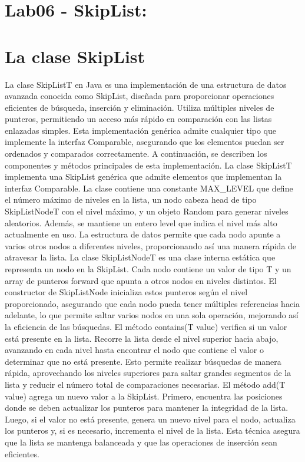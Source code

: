 \section{Lab06 - SkipList:}

\section{La clase SkipList}

La clase SkipList\<T\> en Java es una implementación de una estructura de datos avanzada conocida como SkipList, diseñada para proporcionar operaciones eficientes de búsqueda, inserción y eliminación. Utiliza múltiples niveles de punteros, permitiendo un acceso más rápido en comparación con las listas enlazadas simples. Esta implementación genérica admite cualquier tipo que implemente la interfaz Comparable, asegurando que los elementos puedan ser ordenados y comparados correctamente. A continuación, se describen los componentes y métodos principales de esta implementación.
\singlespacing
La clase SkipList\<T\> implementa una SkipList genérica que admite elementos que implementan la interfaz Comparable. La clase contiene una constante MAX\_LEVEL que define el número máximo de niveles en la lista, un nodo cabeza head de tipo SkipListNode\<T\> con el nivel máximo, y un objeto Random para generar niveles aleatorios. Además, se mantiene un entero level que indica el nivel más alto actualmente en uso. La estructura de datos permite que cada nodo apunte a varios otros nodos a diferentes niveles, proporcionando así una manera rápida de atravesar la lista.
\singlespacing
La clase SkipListNode\<T\> es una clase interna estática que representa un nodo en la SkipList. Cada nodo contiene un valor de tipo T y un array de punteros forward que apunta a otros nodos en niveles distintos. El constructor de SkipListNode inicializa estos punteros según el nivel proporcionado, asegurando que cada nodo pueda tener múltiples referencias hacia adelante, lo que permite saltar varios nodos en una sola operación, mejorando así la eficiencia de las búsquedas.
\singlespacing
El método contains(T value) verifica si un valor está presente en la lista. Recorre la lista desde el nivel superior hacia abajo, avanzando en cada nivel hasta encontrar el nodo que contiene el valor o determinar que no está presente. Esto permite realizar búsquedas de manera rápida, aprovechando los niveles superiores para saltar grandes segmentos de la lista y reducir el número total de comparaciones necesarias.
\singlespacing
El método add(T value) agrega un nuevo valor a la SkipList. Primero, encuentra las posiciones donde se deben actualizar los punteros para mantener la integridad de la lista. Luego, si el valor no está presente, genera un nuevo nivel para el nodo, actualiza los punteros y, si es necesario, incrementa el nivel de la lista. Esta técnica asegura que la lista se mantenga balanceada y que las operaciones de inserción sean eficientes.
